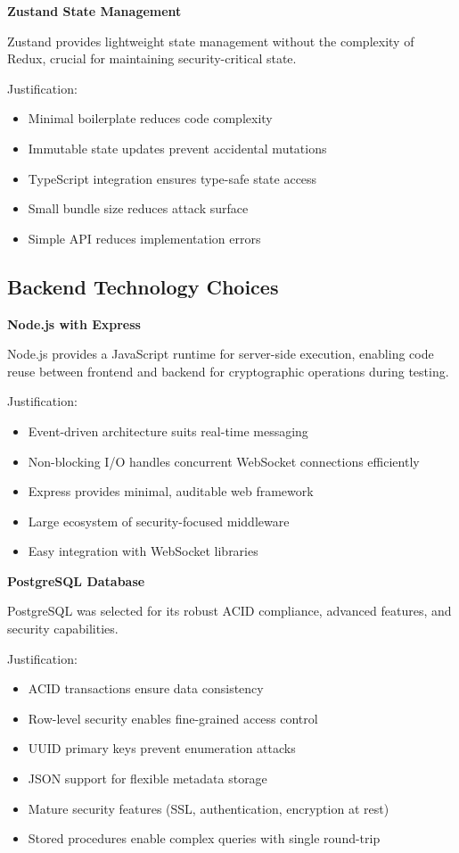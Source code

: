 \textbf{Zustand State Management}

Zustand provides lightweight state management without the complexity of Redux, crucial for maintaining security-critical state.

Justification:
\begin{itemize}
    \item Minimal boilerplate reduces code complexity
    \item Immutable state updates prevent accidental mutations
    \item TypeScript integration ensures type-safe state access
    \item Small bundle size reduces attack surface
    \item Simple API reduces implementation errors
\end{itemize}

\subsection{Backend Technology Choices}

\textbf{Node.js with Express}

Node.js provides a JavaScript runtime for server-side execution, enabling code reuse between frontend and backend for cryptographic operations during testing.

Justification:
\begin{itemize}
    \item Event-driven architecture suits real-time messaging
    \item Non-blocking I/O handles concurrent WebSocket connections efficiently
    \item Express provides minimal, auditable web framework
    \item Large ecosystem of security-focused middleware
    \item Easy integration with WebSocket libraries
\end{itemize}

\textbf{PostgreSQL Database}

PostgreSQL was selected for its robust ACID compliance, advanced features, and security capabilities.

Justification:
\begin{itemize}
    \item ACID transactions ensure data consistency
    \item Row-level security enables fine-grained access control
    \item UUID primary keys prevent enumeration attacks
    \item JSON support for flexible metadata storage
    \item Mature security features (SSL, authentication, encryption at rest)
    \item Stored procedures enable complex queries with single round-trip
\end{itemize}

